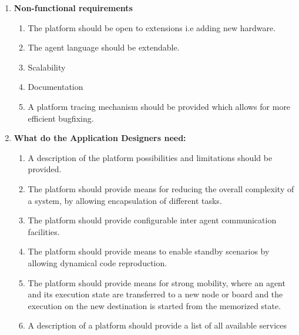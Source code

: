 \documentclass{scrreprt}
\begin{document}
\begin{enumerate}

\item\textbf{Non-functional requirements}

\begin{enumerate}
\item The platform should be open to extensions i.e adding new hardware.
\item The agent language should be extendable.
\item Scalability
\item Documentation 
\item A platform tracing mechanism should be provided which allows for more efficient bugfixing.
\end{enumerate}


\item\textbf{What do the Application Designers need:}
\begin{enumerate}
\item A description of the platform possibilities and limitations should be provided.
\item The platform should provide means for reducing the overall complexity of a system, by allowing encapsulation of different tasks.
\item The platform should provide configurable inter agent communication facilities.
\item The platform should provide means to enable standby scenarios by allowing dynamical code reproduction.
\item The platform should provide means for strong mobility, where an agent and its execution state are transferred to a new node or board and
   the execution on the new destination is started from the memorized state.
\item A description of a platform should provide a list of all available services
\end{enumerate}

\end{enumerate}
\end{document}
